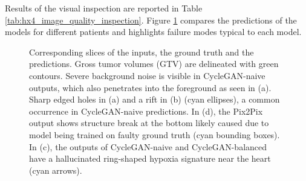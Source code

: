 Results of the visual inspection are reported in Table \ref{tab:hx4_image_quality_inspection}. Figure \ref{fig:hx4_image_quality_inspection_viz} compares the predictions of the models for different patients and highlights failure modes typical to each model.

\begin{table}[h!]
    \footnotesize
    \centering
    \caption{Fraction of the total validation set images meeting the corresponding image degradation criteria. Best and second-to-best values are highlighted with bold and italics font, respectively.}
    \label{tab:hx4_image_quality_inspection}
\end{table}

\begin{figure}
    \centering
    \caption{Corresponding slices of the inputs, the ground truth and the predictions. Gross tumor volumes (GTV) are delineated with green contours. Severe background noise is visible in CycleGAN-naive outputs, which also penetrates into the foreground as seen in (a). Sharp edged holes in (a) and a rift in (b) (cyan ellipses), a common occurrence in CycleGAN-naive predictions. In (d), the Pix2Pix output shows structure break at the bottom likely caused due to model being trained on faulty ground truth (cyan bounding boxes). In (c), the outputs of CycleGAN-naive and CycleGAN-balanced have a hallucinated ring-shaped hypoxia signature near the heart (cyan arrows).}
    \label{fig:hx4_image_quality_inspection_viz}
\end{figure}

